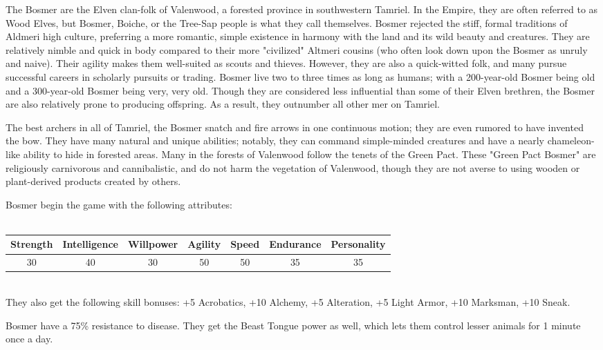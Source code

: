 \documentclass[12pt]{book}
\begin{document}
The Bosmer are the Elven clan-folk of Valenwood, a forested province in southwestern Tamriel. In the Empire, they are often referred to as Wood Elves, but Bosmer, Boiche, or the Tree-Sap people is what they call themselves. Bosmer rejected the stiff, formal traditions of Aldmeri high culture, preferring a more romantic, simple existence in harmony with the land and its wild beauty and creatures. They are relatively nimble and quick in body compared to their more "civilized" Altmeri cousins (who often look down upon the Bosmer as unruly and naive). Their agility makes them well-suited as scouts and thieves. However, they are also a quick-witted folk, and many pursue successful careers in scholarly pursuits or trading. Bosmer live two to three times as long as humans; with a 200-year-old Bosmer being old and a 300-year-old Bosmer being very, very old. Though they are considered less influential than some of their Elven brethren, the Bosmer are also relatively prone to producing offspring. As a result, they outnumber all other mer on Tamriel.

The best archers in all of Tamriel, the Bosmer snatch and fire arrows in one continuous motion; they are even rumored to have invented the bow. They have many natural and unique abilities; notably, they can command simple-minded creatures and have a nearly chameleon-like ability to hide in forested areas. Many in the forests of Valenwood follow the tenets of the Green Pact. These "Green Pact Bosmer" are religiously carnivorous and cannibalistic, and do not harm the vegetation of Valenwood, though they are not averse to using wooden or plant-derived products created by others.

Bosmer begin the game with the following attributes:\\~\\
\begin{tabular}{|c|c|c|c|c|c|c|}
\hline
Strength & Intelligence & Willpower & Agility & Speed & Endurance & Personality\\ \hline
30 & 40 & 30 & 50 & 50 & 35 & 35\\ \hline

\end{tabular}\\

They also get the following skill bonuses: +5 Acrobatics, +10 Alchemy, +5 Alteration, +5 Light Armor, +10 Marksman, +10 Sneak.

Bosmer have a 75\% resistance to disease. They get the Beast Tongue power as well, which lets them control lesser animals for 1 minute once a day.\\
\end{document}
